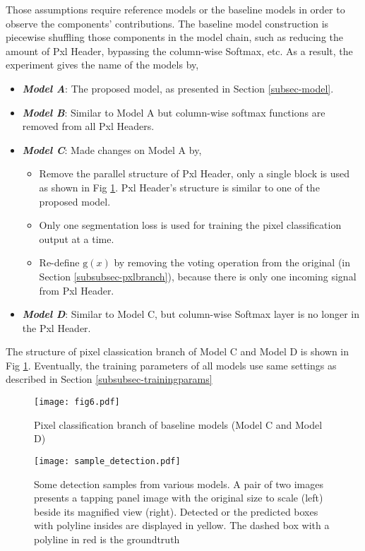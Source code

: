 \documentclass[default,pdflatex,iicol]{sn-jnl}%
\begin{document}
Those assumptions require reference models or the baseline models in order to observe the components' contributions. The baseline model construction is piecewise shuffling those components in the model chain, such as reducing the amount of Pxl Header, bypassing the column-wise Softmax, etc. As a result, the experiment gives the name of the models by,
\begin{itemize} 
\item[] \emph{\textbf{Model A}}: The proposed model, as presented in Section \ref{subsec-model}. \\
\item[] \emph{\textbf{Model B}}: Similar to Model A but column-wise softmax functions are removed from all Pxl Headers. \\
\item[] \emph{\textbf{Model C}}: Made changes on Model A by,
	\begin{itemize}
  	\item Remove the parallel structure of Pxl Header, only a single block is used as shown in Fig \ref{fig6-baselinePxlHeader}. Pxl Header's structure is similar to one of the proposed model. 
  	\item Only one segmentation loss is used for training the pixel classification output at a time.
  	\item Re-define $\mathrm{g}(x)$ by removing the voting operation from the original (in Section \ref{subsubsec-pxlbranch}), because there is only one incoming signal from Pxl Header.
	\end{itemize}
\item[] \emph{\textbf{Model D}}: Similar to Model C, but column-wise Softmax layer is no longer in the Pxl Header.
\end{itemize}

The structure of pixel classication branch of Model C and Model D is shown in Fig \ref{fig6-baselinePxlHeader}. Eventually, the training parameters of all models use same settings as described in Section \ref{subsubsec-trainingparams}

\begin{figure}[h]%
\centering
\texttt{[image: fig6.pdf]}
\caption{Pixel classification branch of baseline models (Model C and Model D)}\label{fig6-baselinePxlHeader}
\end{figure}

\begin{figure*}[!h]%
\centering
\texttt{[image: sample\_detection.pdf]}
\caption{Some detection samples from various models. A pair of two images presents a tapping panel image with the original size to scale (left) beside its magnified view (right). Detected or the predicted boxes with polyline insides are displayed in yellow. The dashed box with a polyline in red is the groundtruth}\label{fig-sampledetection}
\end{figure*}
\end{document}
